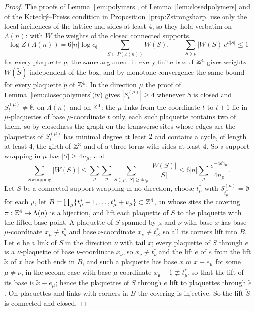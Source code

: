 \begin{proof}
The proofs of Lemma~\ref{lem:polymers}, of Lemma~\ref{lem:closedpolymers}
and of the Koteck\'y--Preiss condition in
Proposition~\ref{prop:Zstrongsharp} use only the local incidences of the
lattice and sides at least $4$, so they hold verbatim on $\Lambda(n)$: with
$W$ the weights of the closed connected supports,
\[
\log Z(\Lambda(n))=6|n|\log c_0+\sum_{S\subset P(\Lambda(n))}W(S),\qquad
\sum_{S\ni p}|W(S)|e^{d|S|}\le1
\]
for every plaquette $p$; the same argument in every finite box of $\mathbb{Z}^4$
gives weights $W(\tilde S)$ independent of the box, and by monotone
convergence the same bound for every plaquette $\tilde p$ of $\mathbb{Z}^4$. In the
direction $\mu$ the proof of Lemma~\ref{lem:closedpolymers}(iv) gives
$|S^{(\mu)}_t|\ge4$ whenever $S$ is closed and $S^{(\mu)}_t\ne\emptyset$,
on $\Lambda(n)$ and on $\mathbb{Z}^4$: the $\mu$-links from the coordinate $t$ to
$t+1$ lie in $\mu$-plaquettes of base $\mu$-coordinate $t$ only, each such
plaquette contains two of them, so by closedness the graph on the transverse
sites whose edges are the plaquettes of $S^{(\mu)}_t$ has minimal degree at
least $2$ and contains a cycle, of length at least $4$, the girth of
$\mathbb{Z}^3$ and of a three-torus with sides at least $4$. So a support wrapping
in $\mu$ has $|S|\ge4n_\mu$, and
\[
\sum_{S\ \text{wrapping}}|W(S)|\le\sum_\mu\sum_p\sum_{S\ni p,\ |S|\ge4n_\mu}
\frac{|W(S)|}{|S|}\le6|n|\sum_\mu\frac{e^{-4dn_\mu}}{4n_\mu}.
\]
Let $S$ be a connected support wrapping in no direction, choose $t^*_\mu$
with $S^{(\mu)}_{t^*_\mu}=\emptyset$ for each $\mu$, let $B=\prod_\mu\{t^*_\mu
+1,\dots,t^*_\mu+n_\mu\}\subset\mathbb{Z}^4$, on whose sites the covering $\pi:\mathbb{Z}^4
\to\Lambda(n)$ is a bijection, and lift each plaquette of $S$ to the
plaquette with the lifted base point. A plaquette of $S$ spanned by $\mu$
and $\nu$ with base $x$ has base $\mu$-coordinate $x_\mu\not\equiv t^*_\mu$
and base $\nu$-coordinate $x_\nu\not\equiv t^*_\nu$, so all its corners lift
into $B$. Let $e$ be a link of $S$ in the direction $\nu$ with tail $x$;
every plaquette of $S$ through $e$ is a $\nu$-plaquette of base
$\nu$-coordinate $x_\nu$, so $x_\nu\not\equiv t^*_\nu$ and the lift $\tilde e$
of $e$ from the lift $\tilde x$ of $x$ has both ends in $B$, and such a
plaquette has base $x$ or $x-e_\mu$ for some $\mu\ne\nu$, in the second case
with base $\mu$-coordinate $x_\mu-1\not\equiv t^*_\mu$, so that the lift of
its base is $\tilde x-e_\mu$; hence the plaquettes of $S$ through $e$ lift to
plaquettes through $\tilde e$. On plaquettes and links with corners in $B$
the covering is injective. So the lift $\tilde S$ is connected and closed,

\end{proof}
